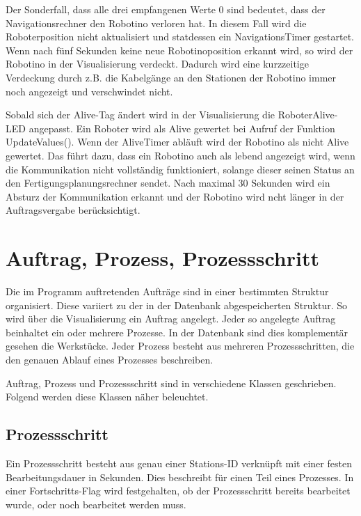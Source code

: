 Der Sonderfall, dass alle drei empfangenen Werte 0 sind bedeutet, dass der Navigationsrechner den Robotino verloren hat. In diesem Fall wird die Roboterposition nicht aktualisiert und statdessen ein NavigationsTimer gestartet. Wenn nach fünf Sekunden keine neue Robotinoposition erkannt wird, so wird der Robotino in der Visualisierung verdeckt. Dadurch wird eine kurzzeitige Verdeckung durch z.B. die Kabelgänge an den Stationen der Robotino immer noch angezeigt und verschwindet nicht.

Sobald sich der Alive-Tag ändert wird in der Visualisierung die RoboterAlive-LED angepasst. Ein Roboter wird als Alive gewertet bei Aufruf der Funktion UpdateValues(). Wenn der AliveTimer abläuft wird der Robotino als nicht Alive gewertet. Das führt dazu, dass ein Robotino auch als lebend angezeigt wird, wenn die Kommunikation nicht vollständig funktioniert, solange dieser seinen Status an den Fertigungsplanungsrechner sendet. Nach maximal 30 Sekunden wird ein Absturz der Kommunikation erkannt und der Robotino wird ncht länger in der Auftragsvergabe berücksichtigt. 

\section{Auftrag, Prozess, Prozessschritt} 
\label{sec:AuftragProzessSchritt}

Die im Programm auftretenden Aufträge sind in einer bestimmten Struktur organisiert. Diese variiert zu der in der Datenbank abgespeicherten Struktur. So wird über die Visualisierung ein Auftrag angelegt. Jeder so angelegte Auftrag beinhaltet ein oder mehrere Prozesse. In der Datenbank sind dies komplementär gesehen die Werkstücke. Jeder Prozess besteht aus mehreren Prozessschritten, die den genauen Ablauf eines Prozesses beschreiben. 

Auftrag, Prozess und Prozessschritt sind in verschiedene Klassen geschrieben. Folgend werden diese Klassen näher beleuchtet. 

\subsection{Prozessschritt}
\label{sec:Prozessschritt}

Ein Prozessschritt besteht aus genau einer Stations-ID verknüpft mit einer festen Bearbeitungsdauer in Sekunden. Dies beschreibt für einen Teil eines Prozesses. In einer Fortschritts-Flag wird festgehalten, ob der Prozessschritt bereits bearbeitet wurde, oder noch bearbeitet werden muss. 


